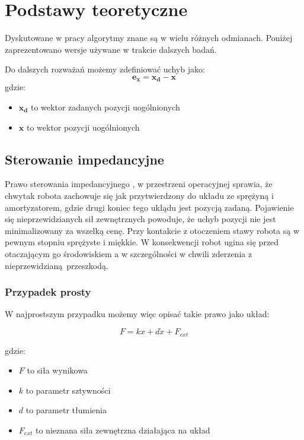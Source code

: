 
\chapter{Podstawy teoretyczne\label{chap:przeglad_literatury}}
Dyskutowane w pracy algorytmy znane są w wielu różnych odmianach. Poniżej zaprezentowano wersje używane w trakcie dalszych badań. 

Do dalszych rozważań możemy zdefiniować uchyb jako:
\begin{equation}
	\boldsymbol{e_x} = \boldsymbol{x_d} - \boldsymbol{x}
\end{equation}
gdzie:
\begin{itemize}
\item $\boldsymbol{x_d}$ to wektor zadanych pozycji uogólnionych
\item $\boldsymbol{x}$ to wektor pozycji uogólnionych
\end{itemize}

\section{Sterowanie impedancyjne}
Prawo sterowania impedancyjnego \cite{bib:impedance}, \cite{wiki:Impedance_control} w przestrzeni operacyjnej sprawia, że chwytak robota zachowuje się jak przytwierdzony do układu ze sprężyną i amortyzatorem, gdzie drugi koniec tego ukłądu jest pozycją zadaną. Pojawienie się nieprzewidzianych sił zewnętrznych powoduje, że uchyb pozycji nie jest minimalizowany za wszelką cenę. Przy kontakcie z otoczeniem stawy robota są w pewnym stopniu sprężyste i miękkie. W konsekwencji robot ugina się przed otaczającym go środowiskiem a w szczególności w chwili zderzenia z nieprzewidzianą przeszkodą. 

\subsection{Przypadek prosty}
W najprostszym przypadku możemy więc opisać takie prawo jako układ: 

	\begin{equation}
	F = kx + d\dot{x} + F_{ext}
	\end{equation}

gdzie:
\begin{itemize}
\item $F$ to siła wynikowa
\item $k$ to parametr sztywności
\item $d$ to parametr tłumienia
\item $F_{ext}$ to nieznana siła zewnętrzna działająca na układ
\end{itemize} 

